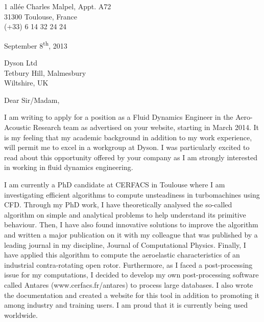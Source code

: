 \documentclass[10pt]{article}
\begin{document}
\begin{flushright}
	1 allée Charles Malpel, Appt. A72 \\
	31300 Toulouse, France \\
	(+33) 6 14 32 24 24 \\
\end{flushright}

\begin{flushright}
September 8\textsuperscript{th}, 2013
\end{flushright}

\begin{flushleft}
Dyson Ltd \\
Tetbury Hill, Malmesbury \\
Wiltshire, UK
\end{flushleft}

\noindent
Dear Sir/Madam,
\newline

\noindent
I am writing to apply for a position as a Fluid Dynamics Engineer in the Aero-Acoustic Research team as advertised on your website, starting in March 2014. It is my feeling that my academic background in addition to my work experience, will permit me to excel in a workgroup at Dyson. I was particularly excited to read about this opportunity offered by your company as I am strongly interested in working in fluid dynamics engineering.
\newline

\noindent
I am currently a PhD candidate at CERFACS in Toulouse where I am investigating efficient algorithms to compute unsteadiness in turbomachines using CFD. Through my PhD work, I have theoretically analysed the so-called algorithm on simple and analytical problems to help understand its primitive behaviour. Then, I have also found innovative solutions to improve the algorithm and written a major publication on it with my colleague that was published by a leading journal in my discipline, Journal of Computational Physics. Finally, I have applied this algorithm to compute the aeroelastic characteristics of an industrial contra-rotating open rotor. Furthermore, as I faced a post-processing issue for my computations, I decided to develop my own post-processing software called Antares (www.cerfacs.fr/antares) to process large databases. I also wrote the documentation and created a website for this tool in addition to promoting it among industry and training users. I am proud that it is currently being used worldwide.
\newline
\end{document}
